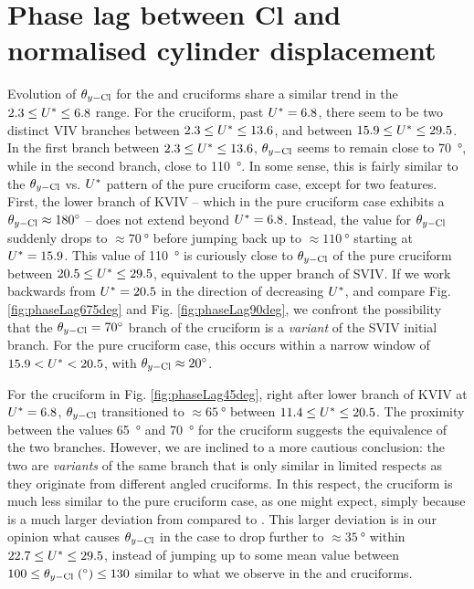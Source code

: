 \documentclass[oneside]{utmthesis}
\begin{document}
\section{Phase lag between Cl and normalised cylinder displacement} \label{sec:phaseLag67545}
Evolution of $\theta_{y-\text{Cl}}$ for the \angfo{} and \angth{} cruciforms share a similar trend in the $2.3 \leq U^{*} \leq 6.8$ range. For the \angfo{} cruciform, past $U^{*} = 6.8$, there seem to be two distinct VIV branches between $2.3 \leq U^{*} \leq 13.6$, and between $15.9 \leq U^{*} \leq 29.5$. In the first branch between $2.3 \leq U^{*} \leq 13.6$, $\theta_{y-\text{Cl}}$ seems to remain close to \SI{70}{\degree}, while in the second branch, close to \SI{110}{\degree}. In some sense, this is fairly similar to the $\theta_{y-\text{Cl}}$ vs. $U^{*}$ pattern of the pure cruciform case, except for two features. First, the lower branch of KVIV -- which in the pure cruciform case exhibits a $\plag \approx \SI{180}{\degree}$ -- does not extend beyond $U^{*} = 6.8$. Instead, the value for $\theta_{y-\text{Cl}}$ suddenly drops to $\approx \SI{70}{\degree}$ before jumping back up to $\approx \SI{110}{\degree}$ starting at $U^{*} = 15.9$. This value of \SI{110}{\degree} is curiously close to $\theta_{y-\text{Cl}}$ of the pure cruciform between $20.5 \leq U^{*} \leq 29.5$, equivalent to the upper branch of SVIV. If we work backwards from $U^{*} = 20.5$ in the direction of decreasing $U^{*}$, and compare Fig. \ref{fig:phaseLag675deg} and Fig. \ref{fig:phaseLag90deg}, we confront the possibility that the $\plag = \SI{70}{\degree}$ branch of the \angfo cruciform is a \textit{variant} of the SVIV initial branch. For the pure cruciform case, this occurs within a narrow window of $15.9 < U^{*} < 20.5$, with $\plag \approx \SI{20}{\degree}$.

For the \angth{} cruciform in Fig. \ref{fig:phaseLag45deg}, right after lower branch of KVIV at $U^{*} = 6.8$, $\theta_{y-\text{Cl}}$ transitioned to $\approx \SI{65}{\degree}$ between $11.4 \leq U^{*} \leq 20.5$. The proximity between the values \SI{65}{\degree} and \SI{70}{\degree} for the \angfo{} cruciform suggests the equivalence of the two branches. However, we are inclined to a more cautious conclusion: the two are \textit{variants} of the same branch that is only similar in limited respects as they originate from different angled cruciforms. In this respect, the \angth{} cruciform is much less similar to the pure cruciform case, as one might expect, simply because \angth{} is a much larger deviation from \angfi{} compared to \angfo{}. This larger deviation is in our opinion what causes $\theta_{y-\text{Cl}}$ in the \angth{} case to drop further to $\approx \SI{35}{\degree}$ within $22.7 \leq U^{*} \leq 29.5$, instead of jumping up to some mean value between $100 \leq \plag \; (\si{\degree}) \leq 130$ similar to what we observe in the \angfi{} and \angfo{} cruciforms.
\end{document}
